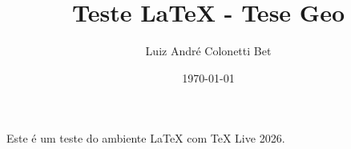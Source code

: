 \documentclass[12pt,a4paper]{article}
\title{Teste LaTeX - Tese Geo}
\author{Luiz André Colonetti Bet}
\date{\today}
\begin{document}
\maketitle

Este é um teste do ambiente LaTeX com TeX Live 2026.
\end{document}
